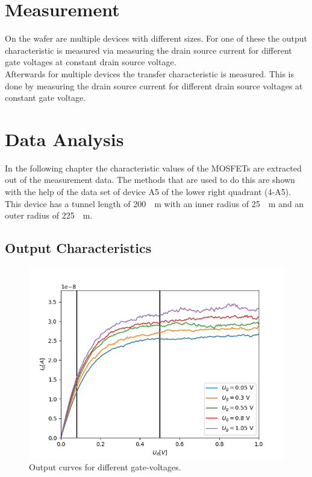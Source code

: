 \documentclass[%
 reprint,
amsmath,amssymb,
pra,
]{revtex4-1}
\begin{document}
\section{Measurement}
On the wafer are multiple devices with different sizes. For one of these the output characteristic is measured via measuring the drain source current for different gate voltages at constant drain source voltage. \\
Afterwards for multiple devices the transfer characteristic is measured. This is done by measuring the drain source current for different drain source voltages at constant gate voltage.

\section{Data Analysis}
In the following chapter the characteristic values of the MOSFETs are extracted out of the measurement data. The methods that are used to do this are shown with the help of the data set of device A5 of the lower right quadrant (4-A5). This device has a tunnel length of \SI{200}{\mu m} with an inner radius of \SI{25}{\mu m} and an outer radius of \SI{225}{\mu m}.
\subsection{Output Characteristics}
\begin{figure}
\centering
\includegraphics[scale=0.6]{Bilder/output.png}
\caption{Output curves for different gate-voltages.}
\label{fig:output}
\end{figure}
\end{document}
